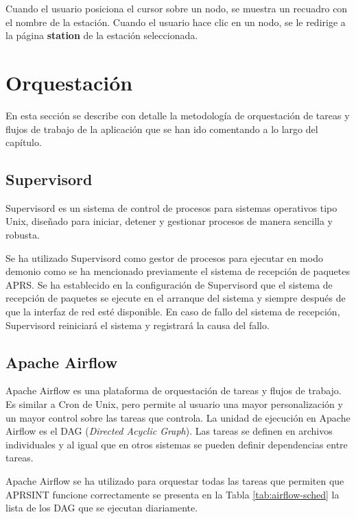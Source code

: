 Cuando el usuario posiciona el cursor sobre un nodo, se muestra un recuadro con el nombre de la estación. Cuando el usuario hace clic en un nodo, se le redirige a la página \textbf{station} de la estación seleccionada.

\section{Orquestación}

En esta sección se describe con detalle la metodología de orquestación de tareas y flujos de trabajo de la aplicación que se han ido comentando a lo largo del capítulo.

\subsection{Supervisord}
Supervisord es un sistema de control de procesos para sistemas operativos tipo Unix, diseñado para iniciar, detener y gestionar procesos de manera sencilla y robusta.

Se ha utilizado Supervisord como gestor de procesos para ejecutar en modo demonio como se ha mencionado previamente el sistema de recepción de paquetes APRS. Se ha establecido en la configuración de Supervisord que el sistema de recepción de paquetes se ejecute en el arranque del sistema y siempre después de que la interfaz de red esté disponible. En caso de fallo del sistema de recepción, Supervisord reiniciará el sistema y registrará la causa del fallo.

\subsection{Apache Airflow}
Apache Airflow es una plataforma de orquestación de tareas y flujos de trabajo. Es similar a Cron de Unix, pero permite al usuario una mayor personalización y un mayor control sobre las tareas que controla. La unidad de ejecución en Apache Airflow es el DAG (\textit{Directed Acyclic Graph}). Las tareas se definen en archivos individuales y al igual que en otros sistemas se pueden definir dependencias entre tareas.

Apache Airflow se ha utilizado para orquestar todas las tareas que permiten que APRSINT funcione correctamente se presenta en la Tabla \ref{tab:airflow-sched} la lista de los DAG que se ejecutan diariamente.

